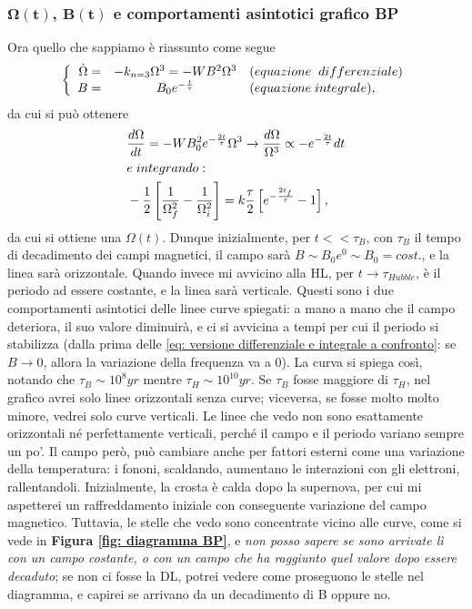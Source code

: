 \subsubsection{$\mathbf{\Omega(t)}$, $\mathbf{B(t)}$ e comportamenti asintotici grafico BP}
Ora quello che sappiamo è riassunto come segue
\begin{equation}
    \left\{ 
    \begin{array}{rcl}
    \dot{\Omega}  = & -k_{n=3}\Omega^3  =  -WB^2\Omega^3 & (equazione\hspace{2mm}differenziale)\\
    B  = & B_0e^{-\frac{t}{\tau}} & (equazione\hspace{1mm}integrale),
    \end{array} %
    \right.
    \label{eq: versione differenziale e integrale a confronto}
\end{equation}
da cui si può ottenere 
\begin{align}
    &\frac{d\Omega}{dt} = -WB_0^2e^{-\frac{2t}{\tau}}\Omega^3\xrightarrow{} \frac{d\Omega}{\Omega^3}\propto -e^{-\frac{2t}{\tau}}dt\notag \\
    &e\hspace{1mm}integrando:\notag\\
    &-\frac{1}{2}\left[ \frac{1}{\Omega_f^2} - \frac{1}{\Omega_i^2} \right] = k\frac{\tau}{2}\left[ e^{-\frac{2t_f}{\tau}} - 1 \right],
\end{align}
da cui si ottiene una $\Omega(t)$.
Dunque inizialmente, per $t<<\tau_B$, con $\tau_B$ il tempo di decadimento dei campi magnetici, il campo sarà $B\sim B_0e^0 \sim B_0 = cost.$, e la linea sarà orizzontale.
Quando invece mi avvicino alla HL, per $t\xrightarrow{}\tau_{Hubble}$, è il periodo ad essere costante, e la linea sarà verticale.
Questi sono i due comportamenti asintotici delle linee curve spiegati: a mano a mano che il campo deteriora, il suo valore diminuirà, e ci si avvicina a tempi per cui il periodo si stabilizza (dalla prima delle \ref{eq: versione differenziale e integrale a confronto}: se $B \xrightarrow{} 0$, allora la variazione della frequenza va a 0).
La curva si spiega così, notando che $\tau_B \sim 10^8yr$ mentre $\tau_H \sim 10^{10}yr$. 
Se $\tau_B$ fosse maggiore di $\tau_H$, nel grafico avrei solo linee orizzontali senza curve; viceversa, se fosse molto molto minore, vedrei solo curve verticali.
Le linee che vedo non sono esattamente orizzontali né perfettamente verticali, perché il campo e il periodo variano sempre un po'.
Il campo però, può cambiare anche per fattori esterni come una variazione della temperatura: i fononi, scaldando, aumentano le interazioni con gli elettroni, rallentandoli.
Inizialmente, la crosta è calda dopo la supernova, per cui mi aspetterei un raffreddamento iniziale con conseguente variazione del campo magnetico.
Tuttavia, le stelle che vedo sono concentrate vicino alle curve, come si vede in \textbf{Figura \ref{fig: diagramma BP}}, e \textit{non posso sapere se sono arrivate lì con un campo costante, o con un campo che ha raggiunto quel valore dopo essere decaduto}; se non ci fosse la DL, potrei vedere come proseguono le stelle nel diagramma, e capirei se arrivano da un decadimento di B oppure no.

